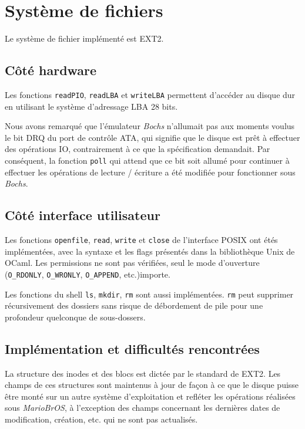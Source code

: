\documentclass[a4paper, 10pt, french]{article}
\newcommand{\foreign}[1]{\emph{#1}}
\newcommand{\mariobros}{\foreign{MarioBrOS}}
\begin{document}
\section{Système de fichiers}

	Le système de fichier implémenté est EXT2.
	
	\subsection{Côté hardware}
	
		Les fonctions \verb|readPIO|, \verb|readLBA| et \verb|writeLBA| 
permettent d'accéder au disque dur en utilisant le système d'adressage LBA 28 
bits.
		
		Nous avons remarqué que l'émulateur \foreign{Bochs} n'allumait 
pas aux moments voulus le bit DRQ du port de contrôle ATA, qui signifie que le 
disque est prêt à effectuer des opérations IO, contrairement à ce que la 
spécification demandait. Par conséquent, la fonction \verb|poll| qui attend que 
ce bit soit allumé pour continuer à effectuer les opérations de lecture / 
écriture a été modifiée pour fonctionner sous \foreign{Bochs}.
	
	\subsection{Côté interface utilisateur}
	
		Les fonctions \verb|openfile|, \verb|read|, \verb|write| et 
\verb|close| de l'interface POSIX ont étés implémentées, avec la syntaxe et les 
flags présentés dans la bibliothèque Unix de OCaml. Les permissions ne sont pas 
vérifiées, seul le mode d'ouverture (\verb|O_RDONLY|, \verb|O_WRONLY|, 
\verb|O_APPEND|, etc.)importe.
		
		Les fonctions du shell \verb|ls|, \verb|mkdir|, \verb|rm| sont 
aussi implémentées. \verb|rm| peut supprimer récursivement des dossiers sans 
risque de débordement de pile pour une profondeur quelconque de sous-dossers.
		
	\subsection{Implémentation et difficultés rencontrées}
	
		La structure des inodes et des blocs est dictée par le standard 
de EXT2. Les champs de ces structures sont maintenus à jour de façon à ce que le 
disque puisse être monté sur un autre système d'exploitation et refléter les 
opérations réalisées sous \mariobros, à l'exception des champs concernant les 
dernières dates de modification, création, etc. qui ne sont pas actualisés.
		
\end{document}

